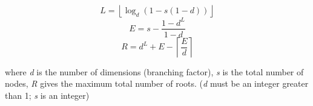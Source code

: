 \documentclass{minimal}
\begin{document}
  \[
  L = \left\lfloor\log_d (1 - s(1 - d))\right\rfloor
  \]
  \[
  E = s - \dfrac{1 - d^L}{1-d}
  \]
  \[
  R = d^L + E - \left\lceil\dfrac{E}{d}\right\rceil
  \]
  
  where \textit{d} is the number of dimensions (branching factor), \textit{s} is 
  the total number of nodes, \textit{R} gives the maximum total number of roots. (\textit{d} must be an integer greater than 1; \textit{s} is an integer)
\end{document}
